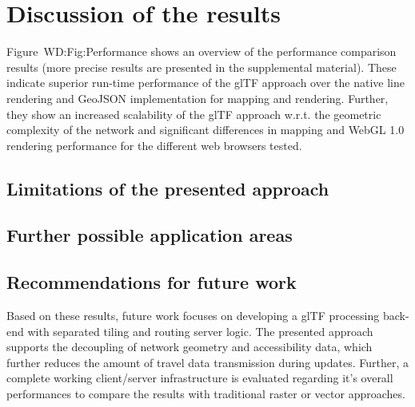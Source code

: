 
\cleardoublepage              %
\chapter{Discussion of the results}
  Figure~{WD:Fig:Performance} shows an overview of the performance comparison
  results (more precise results are presented in the supplemental material).
  These indicate superior run-time performance of the glTF approach over
  the native line rendering and GeoJSON implementation for mapping and rendering.
  Further, they show an increased scalability of the glTF approach w.r.t. the
  geometric complexity of the network and significant differences in mapping
  and WebGL 1.0 rendering performance for the different web browsers tested.\par
  \section{Limitations of the presented approach}
  \section{Further possible application areas}
  \section{Recommendations for future work}
    Based on these results, future work focuses on developing a glTF processing
    back-end with separated tiling and routing server logic. The presented approach
    supports the decoupling of network geometry and accessibility data, which further
    reduces the amount of travel data transmission during updates. Further, a complete
    working client/server infrastructure is evaluated regarding it's overall
    performances to compare the results with traditional raster or vector approaches.\par

